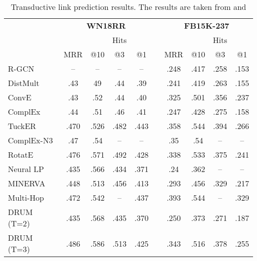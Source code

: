 \documentclass{article}
\begin{document}
\begin{table}[h!]
    \centering  
    \caption{Transductive link prediction results. The results are taken from \cite{lacroix2018canonical, yang2017differentiable} and \cite{sun2018rotate}}
    \label{tab:tran}
    \begin{tabular}{lccccccccc}
        \toprule
         & \multicolumn{4}{c}{\textbf{WN18RR}} & & \multicolumn{4}{c}{\textbf{FB15K-237}} 
        \\
        \cmidrule{2-5} \cmidrule{7-10}
         & & \multicolumn{3}{c}{Hits} & & & \multicolumn{3}{c}{Hits}
        \\
        \cmidrule{3-5} \cmidrule{8-10}
         & MRR & @10 & @3 & @1 & & MRR & @10 & @3 & @1 
        \\
        \midrule
        R-GCN \citep{schlichtkrull2018modeling} & -- & -- & -- & -- & & .248 & .417 & .258 & .153
        \\
        DistMult \citep{Yang2015EmbeddingEA} & .43 & 49 & .44 & .39 & & .241 & .419 & .263 & .155
        \\
        ConvE \citep{dettmers2018convolutional} & .43 & .52 & .44 & .40 & & .325 & .501 & .356 & .237
        \\
        ComplEx \citep{pmlr-v48-trouillon16} & .44 & .51 & .46 & .41 & & .247 & .428 & .275 & .158
        \\
        TuckER \citep{balavzevic2019tucker} & .470 & .526 & .482 & .443 & & .358 & .544 & .394 & .266\\
        ComplEx-N3 \citep{lacroix2018canonical} & .47 & .54 & -- & -- & & .35 & .54 & -- & --
        \\
        RotatE \citep{sun2018rotate} & .476 & .571 & .492 & .428 & & .338 & .533 & .375 & .241
        \\
        \midrule
        Neural LP \citep{yang2017differentiable} & .435 & .566 & .434 & .371 & & .24 & .362 & -- & --
        \\
        MINERVA \citep{das2018go} & .448 & .513 & .456 & .413 & & .293 & .456 & .329 & .217
        \\
        Multi-Hop \citep{lin2018multi} & .472 & .542 & -- & .437 & & .393 & .544 & -- & .329
        \\
DRUM (T=2) & .435 & .568 & .435 & .370 & & .250 & .373 & .271 & .187
        \\ 
        DRUM (T=3) & .486 & .586 & .513 & .425 & & .343 & .516 & .378 & .255 
        \\ 
        \bottomrule
    \end{tabular}
\end{table}
\end{document}
